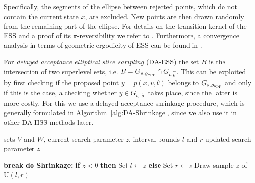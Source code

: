 \documentclass[sn-mathphys-num]{sn-jnl}%
\theoremstyle{thmstyleone}%
\theoremstyle{thmstyletwo}%
\theoremstyle{thmstylethree}%
\newcommand{\rhoapp}{\varrho_{{\rm app}}}
\newcommand{\change}[1]{\bgroup\color{black}#1\egroup}    %
\begin{document}
Specifically, the segments of the ellipse between rejected points, which do not contain the current state $x$, are excluded. New points are then drawn randomly from the remaining part of the ellipse. 
For details on the transition kernel of the ESS and a proof of its $\pi$-reversibility we refer to \cite{HasenpflugEtAl2023}. 
Furthermore, a convergence analysis in terms of geometric ergodicity of ESS can be found in \cite{NatarovskiiEtAl2021}.

For \emph{delayed acceptance elliptical slice sampling} (DA-ESS) the set $B$ is the intersection of two superlevel sets, i.e. $B = G_{s,\rhoapp} \cap G_{t,\widehat{\varrho}}$.
This can be exploited by first checking if the proposed point $y = p(x,v,\theta)$ belongs to $G_{s,\rhoapp}$ and only if this is the case, a checking whether $y\in G_{t,\widehat{\varrho}}$ takes place, since the latter is more costly.
For this we use a delayed acceptance shrinkage procedure, which is generally formulated  in Algorithm~\ref{alg:DA-Shrinkage}, since we also use it in other DA-HSS methods later.

\begin{algorithm}
    \caption{Delayed Acceptance Shrinkage Routine $\mathtt{DA\text{\_}Shrink\change{(V,W,z,l,r)}}$}\label{alg:DA-Shrinkage}
    \renewcommand{\algorithmicrequire}{\textbf{Input:}}
	\renewcommand{\algorithmicensure}{\textbf{Output:}}
    \begin{algorithmic}[1]
        \Require %
        sets $V$ and $W$, \change{current search parameter} $z$, interval bounds $l$ and $r$ 
	    \Ensure updated \change{search parameter} $z$
        
        \State  \textbf{break}
		\EndIf
		\EndIf
		\State \textbf{do Shrinkage:}
		\State \phantom{....} \textbf{if} $z<0$ \textbf{then} Set $l \leftarrow z$ \textbf{else} Set $r\leftarrow z$
		\State \phantom{....} Draw sample $z$ of $\mathrm{U}(l,r)$
        \EndWhile
    \end{algorithmic}
\end{algorithm}
\end{document}
